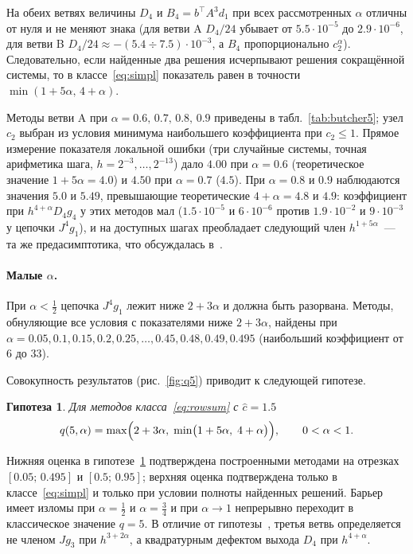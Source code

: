 \documentclass[11pt,a4paper]{article}
\theoremstyle{plain}
\newtheorem{conjecture}{Гипотеза}
\theoremstyle{definition}
\begin{document}
На обеих ветвях величины $D_4$ и $B_4=b^{\top}A^3d_1$ при всех рассмотренных $\alpha$ отличны от нуля и не меняют знака (для ветви A $D_4/24$ убывает от $5.5\cdot10^{-5}$ до $2.9\cdot10^{-6}$, для ветви B $D_4/24\approx-(5.4\div7.5)\cdot10^{-3}$, а $B_4$ пропорционально $c_2^{\alpha}$). Следовательно, если найденные два решения исчерпывают решения сокращённой системы, то в классе~\eqref{eq:simpl} показатель равен в точности $\min(1+5\alpha,\,4+\alpha)$.

Методы ветви A при $\alpha=0.6,\,0.7,\,0.8,\,0.9$ приведены в табл.~\ref{tab:butcher5}; узел $c_2$ выбран из условия минимума наибольшего коэффициента при $c_2\le1$. Прямое измерение показателя локальной ошибки (три случайные системы, точная арифметика шага, $h=2^{-3},\dots,2^{-13}$) дало $4.00$ при $\alpha=0.6$ (теоретическое значение $1+5\alpha=4.0$) и $4.50$ при $\alpha=0.7$ ($4.5$). При $\alpha=0.8$ и $0.9$ наблюдаются значения $5.0$ и $5.49$, превышающие теоретические $4+\alpha=4.8$ и $4.9$: коэффициент при $h^{4+\alpha}D_4g_4$ у этих методов мал ($1.5\cdot10^{-5}$ и $6\cdot10^{-6}$ против $1.9\cdot10^{-2}$ и $9\cdot10^{-3}$ у цепочки $J^4g_1$), и на доступных шагах преобладает следующий член $h^{1+5\alpha}$~--- та же предасимптотика, что обсуждалась в~\cite{PrikBarriers}.



\paragraph{Малые $\alpha$.} При $\alpha<\frac12$ цепочка $J^4g_1$ лежит ниже $2+3\alpha$ и должна быть разорвана. Методы, обнуляющие все условия с показателями ниже $2+3\alpha$, найдены при $\alpha=0.05,0.1,0.15,0.2,0.25,\dots,0.45,0.48,0.49,0.495$ (наибольший коэффициент от 6 до 33).

Совокупность результатов (рис.~\ref{fig:q5}) приводит к следующей гипотезе.

\begin{conjecture}\label{conj:q5}
Для методов класса~\eqref{eq:rowsum} с $\hat c=1.5$
\[
q(5,\alpha)=\max\Bigl(2+3\alpha,\;\min\bigl(1+5\alpha,\;4+\alpha\bigr)\Bigr),\qquad0<\alpha<1 .
\]
\end{conjecture}

Нижняя оценка в гипотезе~\ref{conj:q5} подтверждена построенными методами на отрезках $[0.05;\,0.495]$ и $[0.5;\,0.95]$; верхняя оценка подтверждена только в классе~\eqref{eq:simpl} и только при условии полноты найденных решений. Барьер имеет изломы при $\alpha=\frac12$ и $\alpha=\frac34$ и при $\alpha\to1$ непрерывно переходит в классическое значение $q=5$. В отличие от гипотезы~\cite{PrikBarriers}, третья ветвь определяется не членом $Jg_3$ при $h^{3+2\alpha}$, а квадратурным дефектом выхода $D_4$ при $h^{4+\alpha}$.
\end{document}
